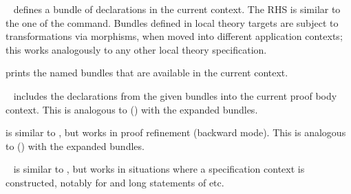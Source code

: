 \begin{isabellebody}
\begin{isamarkuptext}
  \begin{description}

  \item \hyperlink{command.bundle}{\mbox{}}~ defines a bundle of
  declarations in the current context.  The RHS is similar to the one
  of the \hyperlink{command.declare}{\mbox{}} command.  Bundles defined in local theory
  targets are subject to transformations via morphisms, when moved
  into different application contexts; this works analogously to any
  other local theory specification.

  \item \hyperlink{command.print-bundles}{\mbox{}} prints the named bundles that are
  available in the current context.

  \item \hyperlink{command.include}{\mbox{}}~ includes the declarations
  from the given bundles into the current proof body context.  This is
  analogous to \hyperlink{command.note}{\mbox{}} () with the
  expanded bundles.

  \item \hyperlink{command.including}{\mbox{}} is similar to \hyperlink{command.include}{\mbox{}}, but
  works in proof refinement (backward mode).  This is analogous to
  \hyperlink{command.using}{\mbox{}} () with the expanded
  bundles.

  \item \hyperlink{keyword.includes}{\mbox{}}~ is similar to
  \hyperlink{command.include}{\mbox{}}, but works in situations where a specification
  context is constructed, notably for \hyperlink{command.context}{\mbox{}} and long
  statements of \hyperlink{command.theorem}{\mbox{}} etc.


\end{description}
\end{isamarkuptext}
\end{isabellebody}
